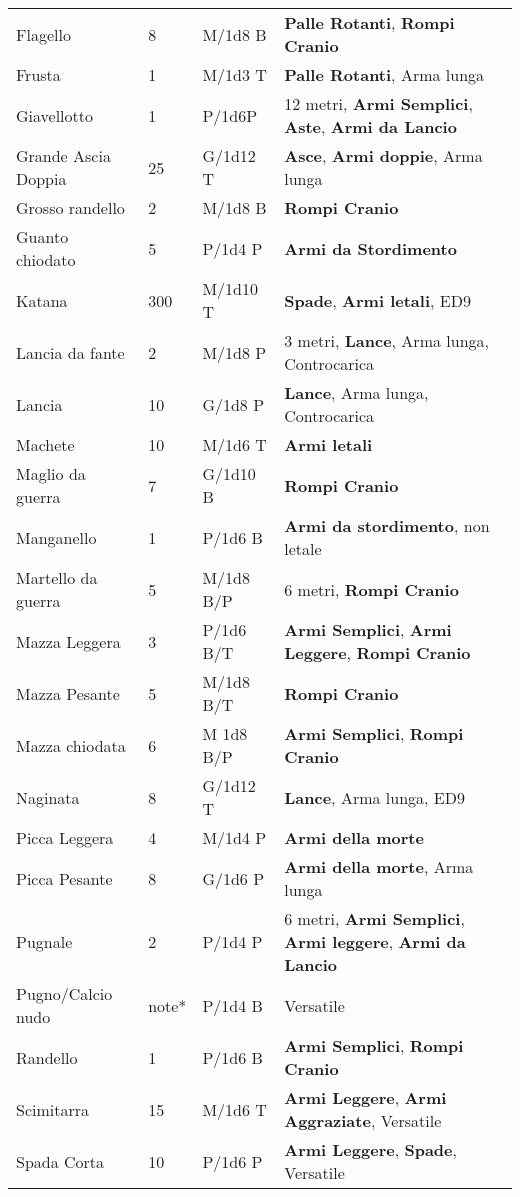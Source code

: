 \documentclass[a4paper,12 pt,openany]{book}
\begin{document}
\begin{textblock*}{19.5cm}
\begin{tabularx}{0.95\textwidth}{llll}
Flagello& 8& M/1d8 B& \textbf{Palle Rotanti}, \textbf{Rompi Cranio}\\
Frusta& 1& M/1d3 T& \textbf{Palle Rotanti}, Arma lunga\\
Giavellotto& 1& P/1d6P& 12 metri,  \textbf{Armi Semplici}, \textbf{Aste}, \textbf{Armi da Lancio}\\
Grande Ascia Doppia& 25 & G/1d12 T& \textbf{Asce}, \textbf{Armi doppie}, Arma lunga\\
Grosso randello& 2& M/1d8 B&\textbf{Rompi Cranio}\\
Guanto chiodato& 5& P/1d4 P&\textbf{Armi da Stordimento}\\
Katana& 300& M/1d10 T& \textbf{Spade}, \textbf{Armi letali}, ED9\\
Lancia da fante& 2& M/1d8 P&3 metri, \textbf{Lance}, Arma lunga, Controcarica\\
Lancia& 10 & G/1d8 P&\textbf{Lance}, Arma lunga, Controcarica\\
Machete& 10 & M/1d6 T&\textbf{Armi letali}\\
Maglio da guerra& 7& G/1d10 B& \textbf{Rompi Cranio}\\
Manganello& 1& P/1d6 B& \textbf{Armi da stordimento}, non letale\\
Martello da guerra& 5& M/1d8 B/P& 6 metri, \textbf{Rompi Cranio}\\
Mazza Leggera& 3& P/1d6 B/T& \textbf{Armi Semplici}, \textbf{Armi Leggere}, \textbf{Rompi Cranio} \\
Mazza Pesante& 5& M/1d8 B/T& \textbf{Rompi Cranio}\\
Mazza chiodata& 6& M 1d8 B/P& \textbf{Armi Semplici}, \textbf{Rompi Cranio}\\
Naginata& 8& G/1d12 T&\textbf{Lance}, Arma lunga, ED9\\
Picca Leggera& 4& M/1d4 P&\textbf{Armi della morte}\\
Picca Pesante& 8& G/1d6 P&\textbf{Armi della morte}, Arma lunga\\
Pugnale& 2& P/1d4 P& 6 metri, \textbf{Armi Semplici}, \textbf{Armi leggere}, \textbf{Armi da Lancio}\\
Pugno/Calcio nudo& note*& P/1d4 B&Versatile\\
Randello& 1& P/1d6 B& \textbf{Armi Semplici}, \textbf{Rompi Cranio}\\
Scimitarra& 15 & M/1d6 T&\textbf{Armi Leggere}, \textbf{Armi Aggraziate}, Versatile\\
Spada Corta& 10 & P/1d6 P&\textbf{Armi Leggere}, \textbf{Spade}, Versatile\\

\end{tabularx}
\end{textblock*}
\end{document}

